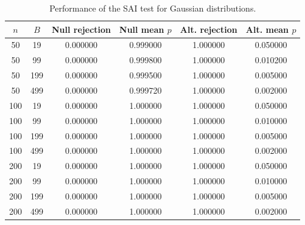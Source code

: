 \begin{table}[htbp]
\centering
\caption{Performance of the SAI test for Gaussian distributions.}
\label{tab:fixed-two-cases}
\begin{tabular}{cccccc}
\hline
$n$ & $B$ & Null rejection & Null mean $p$ & Alt. rejection & Alt. mean $p$ \\
\hline
50 & 19 & 0.000000 & 0.999000 & 1.000000 & 0.050000 \\
50 & 99 & 0.000000 & 0.999800 & 1.000000 & 0.010200 \\
50 & 199 & 0.000000 & 0.999500 & 1.000000 & 0.005000 \\
50 & 499 & 0.000000 & 0.999720 & 1.000000 & 0.002000 \\
100 & 19 & 0.000000 & 1.000000 & 1.000000 & 0.050000 \\
100 & 99 & 0.000000 & 1.000000 & 1.000000 & 0.010000 \\
100 & 199 & 0.000000 & 1.000000 & 1.000000 & 0.005000 \\
100 & 499 & 0.000000 & 1.000000 & 1.000000 & 0.002000 \\
200 & 19 & 0.000000 & 1.000000 & 1.000000 & 0.050000 \\
200 & 99 & 0.000000 & 1.000000 & 1.000000 & 0.010000 \\
200 & 199 & 0.000000 & 1.000000 & 1.000000 & 0.005000 \\
200 & 499 & 0.000000 & 1.000000 & 1.000000 & 0.002000 \\
\hline
\end{tabular}
\end{table}
